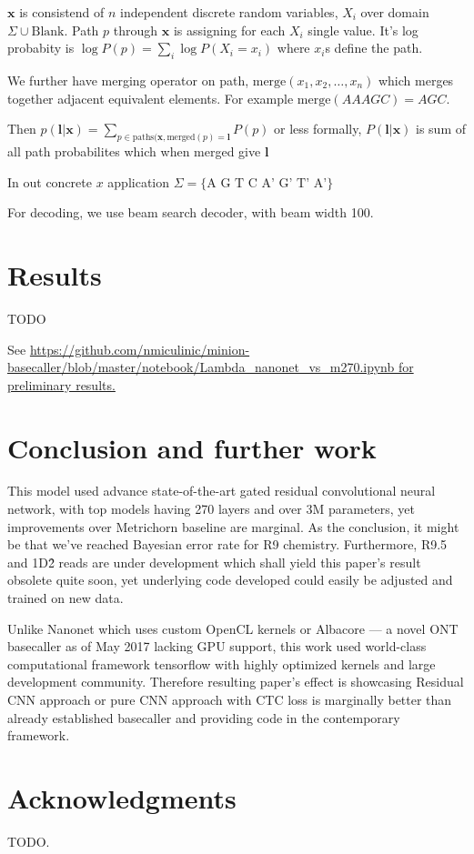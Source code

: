 \documentclass[times, utf8, seminar, numeric]{fer}
\begin{document}
$\mathbf{x}$ is consistend of $n$ independent discrete random variables, $X_i$  over domain $\Sigma \cup \text{Blank}$. Path $p$ through $\mathbf{x}$ is assigning for each $X_i$ single value. It's log probabity is $\log P(p) = \sum_i {\log P(X_i=x_i)}$ where $x_i$s define the path.

We further have merging operator on path, $\text{merge}(x_1, x_2, \ldots, x_n)$ which merges together adjacent equivalent elements. For example $\text{merge}(AAAGC) = AGC$.

Then $p(\mathbf{l}|\mathbf{x}) = \sum_{p\in\text{paths}(\mathbf{x}, \text{merged}(p) = \mathbf{l}}{P(p)}$ or less formally, $P(\mathbf{l}|\mathbf{x})$ is sum of all path probabilites which when merged give $\mathbf{l}$

In out concrete $x$ application $\Sigma = \{\text{A G T C A' G' T' A'}\}$

For decoding, we use beam search decoder, with beam width 100.

\chapter{Results}

TODO

See \url{https://github.com/nmiculinic/minion-basecaller/blob/master/notebook/Lambda_nanonet_vs_m270.ipynb for preliminary results.}

\chapter{Conclusion and further work}

This model used advance state-of-the-art gated residual convolutional neural network, with top models having 270 layers and over 3M parameters, yet improvements over Metrichorn baseline are marginal. As the conclusion, it might be that we've reached Bayesian error rate for R9 chemistry. Furthermore, R9.5 and 1D\^2 reads are under development which shall yield this paper's result obsolete quite soon, yet underlying code developed could easily be adjusted and trained on new data.

Unlike Nanonet which uses custom OpenCL kernels or Albacore --- a novel ONT basecaller as of May 2017 lacking GPU support, this work used world-class computational framework tensorflow with highly optimized kernels and large development community. Therefore resulting paper's effect is showcasing Residual CNN approach or pure CNN approach with CTC loss is marginally better than already established basecaller and providing code in the contemporary framework.

\chapter{Acknowledgments}

TODO.



\end{document}
